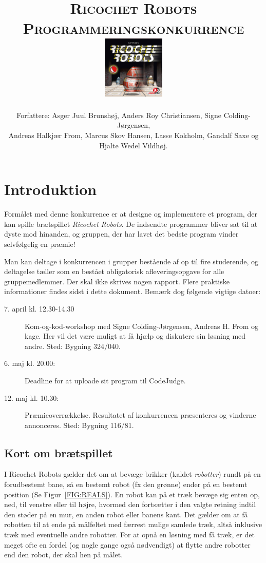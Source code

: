 \documentclass[10pt,a4paper]{article}
\title{\textsc{\Huge Ricochet Robots}\\\textsc{Programmeringskonkurrence}\\[0.25cm]\includegraphics[height=3cm]{img/boxart.jpg}}
\date{}
\author{{\small Forfattere: Asger Juul Brunshøj, Anders Roy Christiansen, Signe Colding-Jørgensen,}\\{\small Andreas Halkjær From, Marcus Skov Hansen, Lasse Kokholm, Gandalf Saxe og Hjalte Wedel Vildhøj.}}
\begin{document}
\maketitle

\section{Introduktion}
Formålet med denne konkurrence er at designe og implementere et program, der kan spille brætspillet \emph{Ricochet Robots}. De indsendte programmer bliver sat til at dyste mod hinanden, og gruppen, der har lavet det bedste program vinder selvfølgelig en præmie!

Man kan deltage i konkurrencen i grupper bestående af op til fire studerende, og deltagelse tæller som en bestået obligatorisk afleveringsopgave for alle gruppemedlemmer. Der skal ikke skrives nogen rapport. Flere praktiske informationer findes sidst i dette dokument. Bemærk dog følgende vigtige datoer:

\begin{description}
\item [7. april kl. 12.30-14.30] Kom-og-kod-workshop med Signe  Colding-Jørgensen, Andreas H. From og kage. Her vil det være muligt at få hjælp og diskutere sin løsning med andre. Sted: Bygning 324/040.
\item [6. maj kl. 20.00:] Deadline for at uploade sit program til CodeJudge.
\item [12. maj kl. 10.30:] Præmieoverrækkelse. Resultatet af konkurrencen præsenteres og vinderne annonceres. Sted: Bygning 116/81.
\end{description}


\subsection{Kort om brætspillet}
I Ricochet Robots gælder det om at bevæge brikker (kaldet \emph{robotter}) rundt på en forudbestemt bane, så en bestemt robot (fx den grønne) ender på en bestemt position (Se Figur~\ref{FIG:REALS}). En robot kan på et træk bevæge sig enten op, ned, til venstre eller til højre, hvormed den fortsætter i den valgte retning indtil den støder på en mur, en anden robot eller banens kant. Det gælder om at få robotten til at ende på målfeltet med færrest mulige samlede træk, altså inklusive træk med eventuelle andre robotter. For at opnå en løsning med få træk, er det meget ofte en fordel (og nogle gange også nødvendigt) at flytte andre robotter end den robot, der skal hen på målet.
\end{document}
